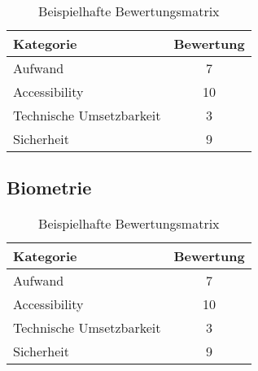 \begin{table}[h!]
    \caption{Beispielhafte Bewertungsmatrix}
    \begin{center}
        \begin{tabular}{l|c}
            Kategorie                       & Bewertung \\\hline
            Aufwand                         & 7         \\
            Accessibility                   & 10        \\
            Technische Umsetzbarkeit        & 3         \\
            Sicherheit                      & 9         
        \end{tabular}
    \end{center}
\end{table}

\subsection{Biometrie}

\begin{table}[h!]
    \caption{Beispielhafte Bewertungsmatrix}
    \begin{center}
        \begin{tabular}{l|c}
            Kategorie                       & Bewertung \\\hline
            Aufwand                         & 7         \\
            Accessibility                   & 10        \\
            Technische Umsetzbarkeit        & 3         \\
            Sicherheit                      & 9         
        \end{tabular}
    \end{center}
\end{table}